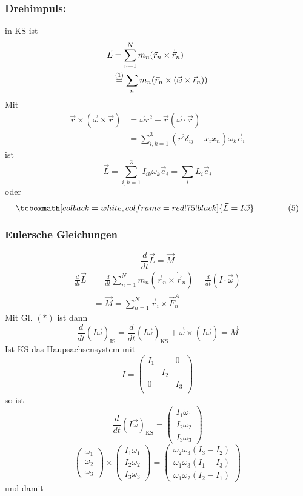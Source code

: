 \documentclass[titlepage,12pt,a4paper,ngerman]{report}
\newcommand{\tx}[1]{\textrm{#1}}
\newcommand{\rmbox}[1]{\tcboxmath[colback=white,colframe=red!75!black]{#1}} %
\begin{document}
\subsubsection{Drehimpuls:}
in KS ist
\begin{align*}
\vec{L} &= \sum_{n=1}^{N} m_n (\vec{r}_n \times \dot{\vec{r}}_n)\\
&\buildrel (1) \over = \sum_n m_n (\vec{r}_n \times (\vec{\omega} \times \vec{r}_n))
\end{align*}
Mit
\begin{align*}
\vec{r} \times (\vec{\omega} \times \vec{r}) &= \vec{\omega}r^2 - \vec{r} ( \vec{\omega}\cdot \vec{r})\\
&= \sum_{i,k=1}^{3} (r^2 \delta_{ij} - x_i x_n) \omega_k \vec{e}_i
\end{align*}
ist 
$$ \vec{L} = \sum_{i,k = 1}^{3} I_{ik} \omega_k \vec{e}_i = \sum_i L_i \vec{e}_i$$
oder 
\begin{equation*}
\rmbox{\vec{L} = I \vec{\omega}} \qquad \tag{5} 
\end{equation*}
\subsubsection{Eulersche Gleichungen}
$$ \frac{d}{dt} \vec{L} = \vec{M}$$
\begin{align*}
\frac{d}{dt} \vec{L} &= \frac{d}{dt} \sum_{n=1}^N m_n (\vec{r}_n \times \dot{\vec{r}}_n) = \frac{d}{dt} ( I \cdot \vec{\omega})\\
&= \vec{M} = \sum_{n=1}^{N} \vec{r}_i \times \vec{F}_n^A
\end{align*}
Mit Gl. $ (*) $ ist dann
\begin{equation*}
\frac{d}{dt} (I \vec{\omega})_{\tx{IS}} = \frac{d}{dt} (I \vec{\omega})_{\tx{KS}} + \vec{\omega} \times (I \vec{\omega}) = \vec{M} \tag{6}
\end{equation*}
Ist KS das Haupsachsensystem mit 
$$ I = \begin{pmatrix}
I_1 & & 0 \\
& I_2 & \\
0 & & I_3\\
\end{pmatrix}$$
so ist 
$$ \frac{d}{dt} (I \vec{\omega})_{\tx{KS}} = \begin{pmatrix}
I_1 \dot{\omega}_1\\
I_2 \dot{\omega}_2\\
I_3 \dot{\omega}_3
\end{pmatrix}$$
$$ \begin{pmatrix}
\omega_1\\ \omega_2 \\ \omega_3
\end{pmatrix} \times \begin{pmatrix}
I_1 \omega_1\\ I_2 \omega_2 \\ I_3 \omega_3
\end{pmatrix} = \begin{pmatrix}
\omega_2 \omega_3 (I_3-I_2)\\
\omega_1 \omega_3 (I_1-I_3)\\
\omega_1 \omega_2 (I_2-I_1)
\end{pmatrix}$$
und damit\\ 
\end{document}
